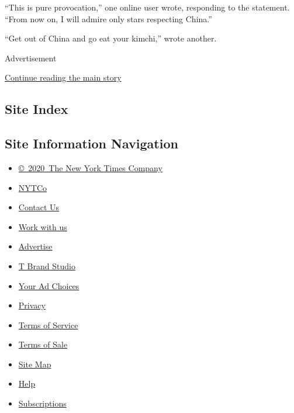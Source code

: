 ``This is pure provocation,'' one online user wrote, responding to the
statement. ``From now on, I will admire only stars respecting China.''

``Get out of China and go eat your kimchi,'' wrote another.

Advertisement

\protect\hyperlink{after-bottom}{Continue reading the main story}

\hypertarget{site-index}{%
\subsection{Site Index}\label{site-index}}

\hypertarget{site-information-navigation}{%
\subsection{Site Information
Navigation}\label{site-information-navigation}}

\begin{itemize}
\tightlist
\item
  \href{https://help.nytimes.com/hc/en-us/articles/115014792127-Copyright-notice}{©~2020~The
  New York Times Company}
\end{itemize}

\begin{itemize}
\tightlist
\item
  \href{https://www.nytco.com/}{NYTCo}
\item
  \href{https://help.nytimes.com/hc/en-us/articles/115015385887-Contact-Us}{Contact
  Us}
\item
  \href{https://www.nytco.com/careers/}{Work with us}
\item
  \href{https://nytmediakit.com/}{Advertise}
\item
  \href{http://www.tbrandstudio.com/}{T Brand Studio}
\item
  \href{https://www.nytimes.com/privacy/cookie-policy\#how-do-i-manage-trackers}{Your
  Ad Choices}
\item
  \href{https://www.nytimes.com/privacy}{Privacy}
\item
  \href{https://help.nytimes.com/hc/en-us/articles/115014893428-Terms-of-service}{Terms
  of Service}
\item
  \href{https://help.nytimes.com/hc/en-us/articles/115014893968-Terms-of-sale}{Terms
  of Sale}
\item
  \href{https://spiderbites.nytimes.com}{Site Map}
\item
  \href{https://help.nytimes.com/hc/en-us}{Help}
\item
  \href{https://www.nytimes.com/subscription?campaignId=37WXW}{Subscriptions}
\end{itemize}
